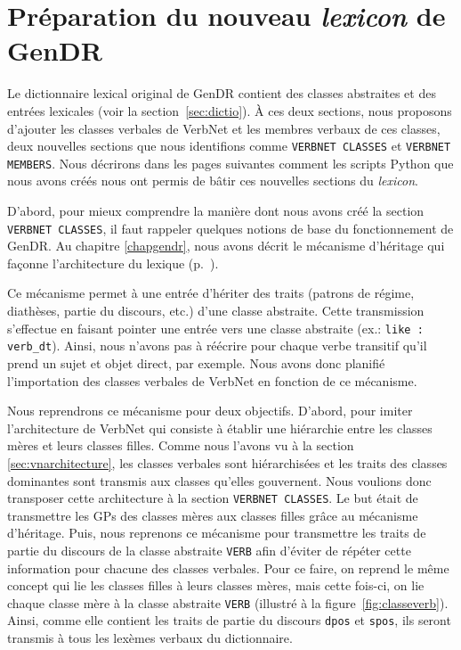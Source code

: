 \section{Préparation du nouveau \emph{lexicon} de GenDR}

Le dictionnaire lexical original de GenDR contient des classes abstraites et des entrées lexicales (voir la section~\ref{sec:dictio}). À ces deux sections, nous proposons d'ajouter les classes verbales de VerbNet et les membres verbaux de ces classes, deux nouvelles sections que nous identifions comme \texttt{VERBNET CLASSES} et \texttt{VERBNET MEMBERS}. Nous décrirons dans les pages suivantes comment les scripts Python que nous avons créés nous ont permis de bâtir ces nouvelles sections du \emph{lexicon}.

D'abord, pour mieux comprendre la manière dont nous avons créé la section \texttt{VERBNET CLASSES}, il faut rappeler quelques notions de base du fonctionnement de GenDR. Au chapitre \ref{chapgendr}, nous avons décrit le mécanisme d'héritage qui façonne l'architecture du lexique (p.~\pageref{sec:dictio}). 

Ce mécanisme permet à une entrée d'hériter des traits (patrons de régime, diathèses, partie du discours, etc.) d'une classe abstraite. Cette transmission s'effectue en faisant pointer une entrée vers une classe abstraite (ex.: \texttt{like : verb\_dt}). Ainsi, nous n'avons pas à réécrire pour chaque verbe transitif qu'il prend un sujet et objet direct, par exemple. Nous avons donc planifié l'importation des classes verbales de VerbNet en fonction de ce mécanisme.  

Nous reprendrons ce mécanisme pour deux objectifs. D'abord, pour imiter l'architecture de VerbNet qui consiste à établir une hiérarchie entre les classes mères et leurs classes filles. Comme nous l'avons vu à la section \ref{sec:vnarchitecture}, les classes verbales sont hiérarchisées et les traits des classes dominantes sont transmis aux classes qu'elles gouvernent. Nous voulions donc transposer cette architecture à la section \texttt{VERBNET CLASSES}. Le but était de transmettre les \acp{GP} des classes mères aux classes filles grâce au mécanisme d'héritage. Puis, nous reprenons ce mécanisme pour transmettre les traits de partie du discours de la classe abstraite \texttt{VERB} afin d'éviter de répéter cette information pour chacune des classes verbales. Pour ce faire, on reprend le même concept qui lie les classes filles à leurs classes mères, mais cette fois-ci, on lie chaque classe mère à la classe abstraite \texttt{VERB} (illustré à la figure~\ref{fig:classeverb}). Ainsi, comme elle contient les traits de partie du discours \texttt{dpos} et \texttt{spos}, ils seront transmis à tous les lexèmes verbaux du dictionnaire.

